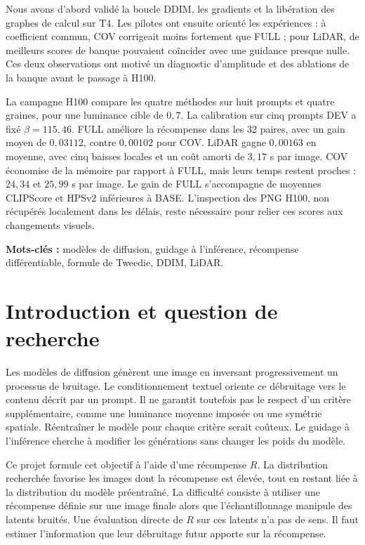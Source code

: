 \documentclass[11pt,a4paper]{article}
\begin{document}
Nous avons d'abord validé la boucle DDIM, les gradients et la libération des graphes de calcul sur T4. Les pilotes ont ensuite orienté les expériences : à coefficient commun, COV corrigeait moins fortement que FULL ; pour LiDAR, de meilleurs scores de banque pouvaient coïncider avec une guidance presque nulle. Ces deux observations ont motivé un diagnostic d'amplitude et des ablations de la banque avant le passage à H100.

La campagne H100 compare les quatre méthodes sur huit prompts et quatre graines, pour une luminance cible de $0{,}7$. La calibration sur cinq prompts DEV a fixé $\beta=115{,}46$. FULL améliore la récompense dans les 32 paires, avec un gain moyen de $0{,}03112$, contre $0{,}00102$ pour COV. LiDAR gagne $0{,}00163$ en moyenne, avec cinq baisses locales et un coût amorti de $3{,}17$ s par image. COV économise de la mémoire par rapport à FULL, mais leurs temps restent proches : $24{,}34$ et $25{,}99$ s par image. Le gain de FULL s'accompagne de moyennes CLIPScore et HPSv2 inférieures à BASE. L'inspection des PNG H100, non récupérés localement dans les délais, reste nécessaire pour relier ces scores aux changements visuels.

\vspace{0.5em}
\noindent\textbf{Mots-clés :} modèles de diffusion, guidage à l'inférence, récompense différentiable, formule de Tweedie, DDIM, LiDAR.
\clearpage
{\small\setlength{\parskip}{2pt}\tableofcontents}
\clearpage
{}

\section{Introduction et question de recherche}
Les modèles de diffusion génèrent une image en inversant progressivement un processus de bruitage. Le conditionnement textuel oriente ce débruitage vers le contenu décrit par un prompt. Il ne garantit toutefois pas le respect d'un critère supplémentaire, comme une luminance moyenne imposée ou une symétrie spatiale. Réentraîner le modèle pour chaque critère serait coûteux. Le guidage à l'inférence cherche à modifier les générations sans changer les poids du modèle.

Ce projet formule cet objectif à l'aide d'une récompense $R$. La distribution recherchée favorise les images dont la récompense est élevée, tout en restant liée à la distribution du modèle préentraîné. La difficulté consiste à utiliser une récompense définie sur une image finale alors que l'échantillonnage manipule des latents bruités. Une évaluation directe de $R$ sur ces latents n'a pas de sens. Il faut estimer l'information que leur débruitage futur apporte sur la récompense.
\end{document}
